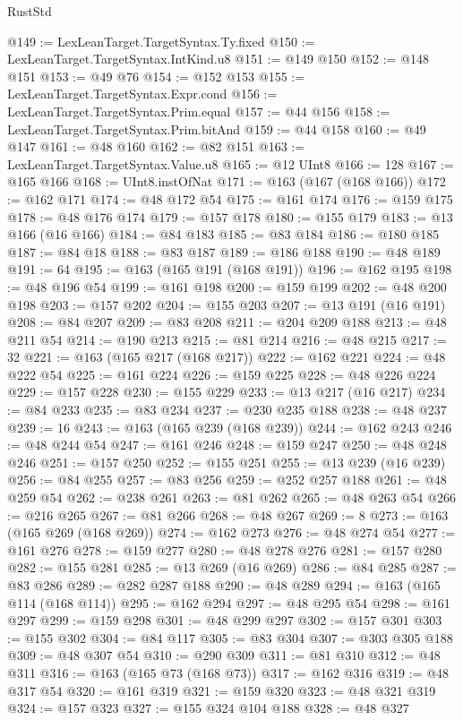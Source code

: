 \begin{lexlean}{RustStd}
\begin{coremodule}
{\begin{coremodule}
{{{{{@149 := LexLeanTarget.TargetSyntax.Ty.fixed
@150 := LexLeanTarget.TargetSyntax.IntKind.u8
@151 := @149 @150
@152 := @148 @151
@153 := @49 @76
@154 := @152 @153
@155 := LexLeanTarget.TargetSyntax.Expr.cond
@156 := LexLeanTarget.TargetSyntax.Prim.equal
@157 := @44 @156
@158 := LexLeanTarget.TargetSyntax.Prim.bitAnd
@159 := @44 @158
@160 := @49 @147
@161 := @48 @160
@162 := @82 @151
@163 := LexLeanTarget.TargetSyntax.Value.u8
@165 := @12 UInt8
@166 := 128
@167 := @165 @166
@168 := UInt8.instOfNat
@171 := @163 (@167 (@168 @166))
@172 := @162 @171
@174 := @48 @172 @54
@175 := @161 @174
@176 := @159 @175
@178 := @48 @176 @174
@179 := @157 @178
@180 := @155 @179
@183 := @13 @166 (@16 @166)
@184 := @84 @183
@185 := @83 @184
@186 := @180 @185
@187 := @84 @18
@188 := @83 @187
@189 := @186 @188
@190 := @48 @189
@191 := 64
@195 := @163 (@165 @191 (@168 @191))
@196 := @162 @195
@198 := @48 @196 @54
@199 := @161 @198
@200 := @159 @199
@202 := @48 @200 @198
@203 := @157 @202
@204 := @155 @203
@207 := @13 @191 (@16 @191)
@208 := @84 @207
@209 := @83 @208
@211 := @204 @209 @188
@213 := @48 @211 @54
@214 := @190 @213
@215 := @81 @214
@216 := @48 @215
@217 := 32
@221 := @163 (@165 @217 (@168 @217))
@222 := @162 @221
@224 := @48 @222 @54
@225 := @161 @224
@226 := @159 @225
@228 := @48 @226 @224
@229 := @157 @228
@230 := @155 @229
@233 := @13 @217 (@16 @217)
@234 := @84 @233
@235 := @83 @234
@237 := @230 @235 @188
@238 := @48 @237
@239 := 16
@243 := @163 (@165 @239 (@168 @239))
@244 := @162 @243
@246 := @48 @244 @54
@247 := @161 @246
@248 := @159 @247
@250 := @48 @248 @246
@251 := @157 @250
@252 := @155 @251
@255 := @13 @239 (@16 @239)
@256 := @84 @255
@257 := @83 @256
@259 := @252 @257 @188
@261 := @48 @259 @54
@262 := @238 @261
@263 := @81 @262
@265 := @48 @263 @54
@266 := @216 @265
@267 := @81 @266
@268 := @48 @267
@269 := 8
@273 := @163 (@165 @269 (@168 @269))
@274 := @162 @273
@276 := @48 @274 @54
@277 := @161 @276
@278 := @159 @277
@280 := @48 @278 @276
@281 := @157 @280
@282 := @155 @281
@285 := @13 @269 (@16 @269)
@286 := @84 @285
@287 := @83 @286
@289 := @282 @287 @188
@290 := @48 @289
@294 := @163 (@165 @114 (@168 @114))
@295 := @162 @294
@297 := @48 @295 @54
@298 := @161 @297
@299 := @159 @298
@301 := @48 @299 @297
@302 := @157 @301
@303 := @155 @302
@304 := @84 @117
@305 := @83 @304
@307 := @303 @305 @188
@309 := @48 @307 @54
@310 := @290 @309
@311 := @81 @310
@312 := @48 @311
@316 := @163 (@165 @73 (@168 @73))
@317 := @162 @316
@319 := @48 @317 @54
@320 := @161 @319
@321 := @159 @320
@323 := @48 @321 @319
@324 := @157 @323
@327 := @155 @324 @104 @188
@328 := @48 @327
}}}}}
\end{coremodule}}
\end{coremodule}
\end{lexlean}
